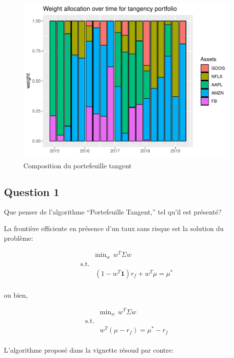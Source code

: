 \documentclass[
]{article}
\begin{document}
\begin{figure}
\centering
\includegraphics{TP-4_files/figure-latex/unnamed-chunk-10-1.pdf}
\caption{Composition du portefeuille tangent}
\end{figure}

\hypertarget{question-1}{%
\subsection{Question 1}\label{question-1}}

Que penser de l'algorithme ``Portefeuille Tangent,'' tel qu'il est
présenté?

La frontière efficiente en présence d'un taux sans risque est la
solution du problème:

\[
\begin{aligned}
    & \mbox{min}_w \ \   w^T \Sigma w \\
    \mbox{s.t.} & \\
    & \left(1- w^T \mathbf{1} \right) r_f + w^T \mu = \mu^* \\
\end{aligned}
\]

ou bien,

\[
\begin{aligned}
    & \mbox{min}_w \ \   w^T \Sigma w \\
    \mbox{s.t.} & \\
    & w^T (\mu - r_f) = \mu^* -r_f\\
\end{aligned}
\]

L'algorithme proposé dans la vignette résoud par contre:
\end{document}
